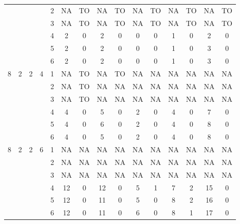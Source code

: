 \begin{longtable}{|c|c|c|c|c|c c|c c|c c|c c|c c|}
 & & & & 2 & NA & TO & NA & TO & NA & TO & NA & TO & NA & TO \\
 & & & & 3 & NA & TO & NA & TO & NA & TO & NA & TO & NA & TO \\
 & & & & 4 & 2 & 0 & 2 & 0 & 0 & 0 & 1 & 0 & 2 & 0 \\
 & & & & 5 & 2 & 0 & 2 & 0 & 0 & 0 & 1 & 0 & 3 & 0 \\
 & & & & 6 & 2 & 0 & 2 & 0 & 0 & 0 & 1 & 0 & 3 & 0 \\
\hline
\multirow{6}{*}{8} & \multirow{6}{*}{2} & \multirow{6}{*}{2} & \multirow{6}{*}{4} & 1 & NA & TO & NA & TO & NA & NA & NA & NA & NA & NA \\
 & & & & 2 & NA & TO & NA & NA & NA & NA & NA & NA & NA & NA \\
 & & & & 3 & NA & TO & NA & NA & NA & NA & NA & NA & NA & NA \\
 & & & & 4 & 4 & 0 & 5 & 0 & 2 & 0 & 4 & 0 & 7 & 0 \\
 & & & & 5 & 4 & 0 & 6 & 0 & 2 & 0 & 4 & 0 & 8 & 0 \\
 & & & & 6 & 4 & 0 & 5 & 0 & 2 & 0 & 4 & 0 & 8 & 0 \\
\hline
\multirow{6}{*}{8} & \multirow{6}{*}{2} & \multirow{6}{*}{2} & \multirow{6}{*}{6} & 1 & NA & NA & NA & NA & NA & NA & NA & NA & NA & NA \\
 & & & & 2 & NA & NA & NA & NA & NA & NA & NA & NA & NA & NA \\
 & & & & 3 & NA & NA & NA & NA & NA & NA & NA & NA & NA & NA \\
 & & & & 4 & 12 & 0 & 12 & 0 & 5 & 1 & 7 & 2 & 15 & 0 \\
 & & & & 5 & 12 & 0 & 11 & 0 & 5 & 0 & 8 & 2 & 16 & 0 \\
 & & & & 6 & 12 & 0 & 11 & 0 & 6 & 0 & 8 & 1 & 17 & 0 \\
\hline
\end{longtable}
